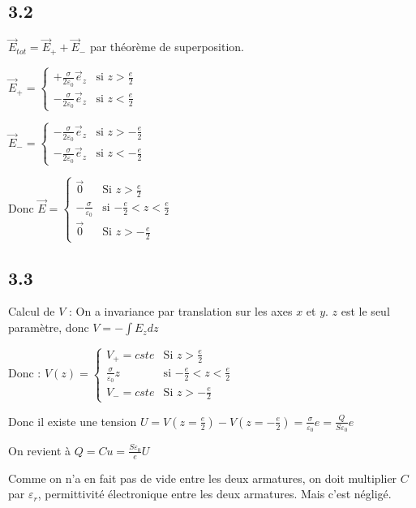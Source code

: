 \documentclass[a4paper,12pt]{book}
\begin{document}
\subsection{3.2}
$\vec{E}_{tot} = \vec{E}_+ + \vec{E}_-$ par théorème de superposition. 
\par $\vec{E}_+=\left\{\begin{array}{rl} +\frac{\sigma}{2\varepsilon_0}\vec{e}_z & \text{si $z>\frac{e}{2}$} \\ -\frac{\sigma}{2\varepsilon_0}\vec{e}_z & \text{si $z<\frac{e}{2}$} \end{array}\right.$
\par $\vec{E}_-=\left\{\begin{array}{rl} -\frac{\sigma}{2\varepsilon_0}\vec{e}_z & \text{si $z>-\frac{e}{2}$} \\ -\frac{\sigma}{2\varepsilon_0}\vec{e}_z & \text{si $z<-\frac{e}{2}$} \end{array}\right.$
\par Donc $\vec{E}=\left\{\begin{array}{rl} \vec{0} & \text{Si $z>\frac{e}{2}$} \\ -\frac{\sigma}{\varepsilon_0} & \text{si $-\frac{e}{2}<z<\frac{e}{2}$} \\ \vec{0} & \text{Si $z>-\frac{e}{2}$} \end{array}\right.$

\subsection{3.3}
Calcul de $V$ : On a invariance par translation sur les axes $x$ et $y$. $z$ est le seul paramètre, donc $V=-\int E_zdz$
\par Donc : $V(z)=\left\{\begin{array}{cl} V_+=cste & \text{Si $z>\frac{e}{2}$} \\ \frac{\sigma}{\varepsilon_0}z & \text{si $-\frac{e}{2}<z<\frac{e}{2}$} \\ V_-=cste & \text{Si $z>-\frac{e}{2}$} \end{array}\right.$
\par Donc il existe une tension $U = V(z=\frac{e}{2}) - V(z=-\frac{e}{2}) = \frac{\sigma}{\varepsilon_0}e = \frac{Q}{S\varepsilon_0}e$ \par On revient à $Q=Cu=\frac{S\varepsilon_0}{e}U$
\par Comme on n'a en fait pas de vide entre les deux armatures, on doit multiplier $C$ par $\varepsilon_r$, permittivité électronique entre les deux armatures. Mais c'est négligé.
\end{document}
